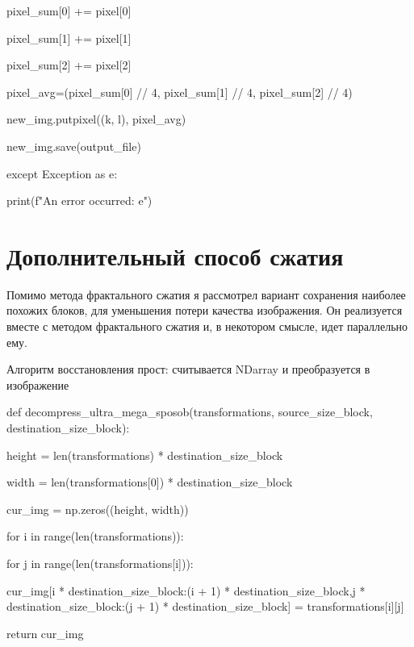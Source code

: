 \documentclass{article}
\begin{document}
{\hspace{7cm}							pixel\_sum[0] += pixel[0]

\hspace{7cm}							pixel\_sum[1] += pixel[1]

\hspace{7cm}							pixel\_sum[2] += pixel[2]

\hspace{4cm}				pixel\_avg=(pixel\_sum[0] // 4, pixel\_sum[1] // 4, pixel\_sum[2] // 4)

\hspace{4cm}				new\_img.putpixel((k, l), pixel\_avg)

\hspace{2cm}		new\_img.save(output\_file)

\hspace{1cm}	except Exception as e:

\hspace{2cm}		print(f"An error occurred: {e}")

}
\vspace{1em}

\section{Дополнительный способ сжатия}

Помимо метода фрактального сжатия я рассмотрел вариант сохранения наиболее похожих блоков, для уменьшения потери качества изображения. Он реализуется вместе с методом фрактального сжатия и, в некотором смысле, идет параллельно ему.

Алгоритм восстановления прост: считывается NDarray и преобразуется в изображение

{
	def decompress\_ultra\_mega\_sposob(transformations, source\_size\_block, destination\_size\_block):
	
\hspace{2cm}	height = len(transformations) * destination\_size\_block

\hspace{2cm}	width = len(transformations[0]) * destination\_size\_block

\hspace{2cm}	cur\_img = np.zeros((height, width))

	
\hspace{2cm}	for i in range(len(transformations)):

\hspace{3cm}		for j in range(len(transformations[i])):

\hspace{4cm}		cur\_img[i * destination\_size\_block:(i + 1) * destination\_size\_block,j * destination\_size\_block:(j + 1) * destination\_size\_block] = transformations[i][j]

	
\hspace{2cm}	return cur\_img

}
\vspace{1em}
\end{document}
